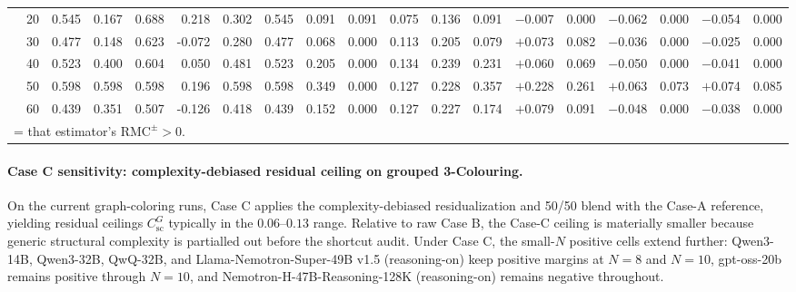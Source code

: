 \documentclass[conference]{IEEEtran}
\theoremstyle{remark}
\newcommand{\RMC}{\mathrm{RMC}}
\newcommand{\shortcutCeiling}{C_{\mathrm{sc}}^{G}}
\begin{document}
\begin{table}[ht]
{\begin{tabular}{p{1.55cm}r rrrr rr rr rr r rr rr rr}
  & 20 & 0.545 & 0.167 & 0.688 & 0.218 & 0.302 & 0.545 & 0.091 & 0.091 & 0.075 & 0.136 & 0.091 & $-$0.007 & 0.000 & $-$0.062 & 0.000 & $-$0.054 & 0.000 \\
  & 30 & 0.477 & 0.148 & 0.623 & -0.072 & 0.280 & 0.477 & 0.068 & 0.000 & 0.113 & 0.205 & 0.079 & \cellcolor{green!15}$+$0.073 & \cellcolor{green!15}0.082 & $-$0.036 & 0.000 & $-$0.025 & 0.000 \\
  & 40 & 0.523 & 0.400 & 0.604 & 0.050 & 0.481 & 0.523 & 0.205 & 0.000 & 0.134 & 0.239 & 0.231 & \cellcolor{green!15}$+$0.060 & \cellcolor{green!15}0.069 & $-$0.050 & 0.000 & $-$0.041 & 0.000 \\
  & 50 & 0.598 & 0.598 & 0.598 & 0.196 & 0.598 & 0.598 & 0.349 & 0.000 & 0.127 & 0.228 & 0.357 & \cellcolor{green!15}$+$0.228 & \cellcolor{green!15}0.261 & \cellcolor{green!15}$+$0.063 & \cellcolor{green!15}0.073 & \cellcolor{green!15}$+$0.074 & \cellcolor{green!15}0.085 \\
  & 60 & 0.439 & 0.351 & 0.507 & -0.126 & 0.418 & 0.439 & 0.152 & 0.000 & 0.127 & 0.227 & 0.174 & \cellcolor{green!15}$+$0.079 & \cellcolor{green!15}0.091 & $-$0.048 & 0.000 & $-$0.038 & 0.000 \\
\bottomrule
\multicolumn{19}{l}{\colorbox{green!15}{\phantom{X}} = that estimator's $\RMC^{\pm}>0$.}
\end{tabular}%
}
\end{table}

\paragraph{Case C sensitivity: complexity-debiased residual ceiling on grouped 3-Colouring.}
On the current graph-coloring runs, Case C applies the complexity-debiased residualization and 50/50 blend with the Case-A reference, yielding residual ceilings $\shortcutCeiling$ typically in the $0.06$--$0.13$ range.
Relative to raw Case B, the Case-C ceiling is materially smaller because generic structural complexity is partialled out before the shortcut audit.
Under Case C, the small-$N$ positive cells extend further: Qwen3-14B, Qwen3-32B, QwQ-32B, and Llama-Nemotron-Super-49B v1.5 (reasoning-on) keep positive margins at $N=8$ and $N=10$, gpt-oss-20b remains positive through $N=10$, and Nemotron-H-47B-Reasoning-128K (reasoning-on) remains negative throughout.
\end{document}
